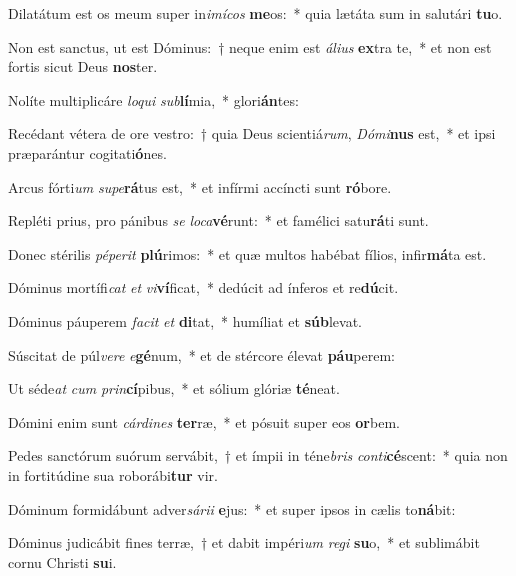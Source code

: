 \item Dilatátum est os meum super in\textit{i}\textit{mí}\textit{cos} \textbf{me}os:~* quia lætáta sum in salutári \textbf{tu}o.
\item Non est sanctus, ut est Dóminus:~† neque enim est \textit{á}\textit{li}\textit{us} \textbf{ex}tra te,~* et non est fortis sicut Deus \textbf{nos}ter.
\item Nolíte multiplicáre \textit{lo}\textit{qui} \textit{sub}\textbf{lí}mia,~* glori\textbf{án}tes:
\item Recédant vétera de ore vestro:~† quia Deus scientiá\textit{rum}, \textit{Dó}\textit{mi}\textbf{nus} est,~* et ipsi præparántur cogitati\textbf{ó}nes.
\item Arcus fórti\textit{um} \textit{su}\textit{pe}\textbf{rá}tus est,~* et infírmi accíncti sunt \textbf{ró}bore.
\item Repléti prius, pro pánibus \textit{se} \textit{lo}\textit{ca}\textbf{vé}runt:~* et famélici satu\textbf{rá}ti sunt.
\item Donec stérilis \textit{pé}\textit{pe}\textit{rit} \textbf{plú}rimos:~* et quæ multos habébat fílios, infir\textbf{má}ta est.
\item Dóminus mortífi\textit{cat} \textit{et} \textit{vi}\textbf{ví}ficat,~* dedúcit ad ínferos et re\textbf{dú}cit.
\item Dóminus páuperem \textit{fa}\textit{cit} \textit{et} \textbf{di}tat,~* humíliat et \textbf{súb}levat.
\item Súscitat de púl\textit{ve}\textit{re} \textit{e}\textbf{gé}num,~* et de stércore élevat \textbf{páu}perem:
\item Ut séde\textit{at} \textit{cum} \textit{prin}\textbf{cí}pibus,~* et sólium glóriæ \textbf{té}neat.
\item Dómini enim sunt \textit{cár}\textit{di}\textit{nes} \textbf{ter}ræ,~* et pósuit super eos \textbf{or}bem.
\item Pedes sanctórum suórum servábit,~† et ímpii in téne\textit{bris} \textit{con}\textit{ti}\textbf{cé}scent:~* quia non in fortitúdine sua roborábi\textbf{tur} vir.
\item Dóminum formidábunt adver\textit{sá}\textit{ri}\textit{i} \textbf{e}jus:~* et super ipsos in cælis to\textbf{ná}bit:
\item Dóminus judicábit fines terræ,~† et dabit impéri\textit{um} \textit{re}\textit{gi} \textbf{su}o,~* et sublimábit cornu Christi \textbf{su}i.
